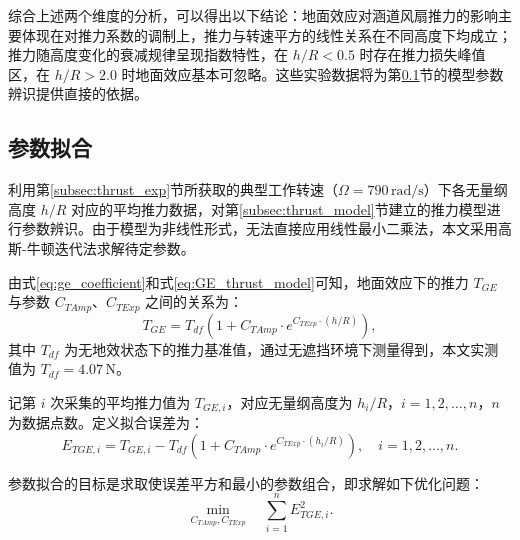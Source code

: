 综合上述两个维度的分析，可以得出以下结论：地面效应对涵道风扇推力的影响主要体现在对推力系数的调制上，推力与转速平方的线性关系在不同高度下均成立；推力随高度变化的衰减规律呈现指数特性，在 $h/R < 0.5$ 时存在推力损失峰值区，在 $h/R > 2.0$ 时地面效应基本可忽略。这些实验数据将为第\ref{subsec:thrust_fitting}节的模型参数辨识提供直接的依据。

\subsection{参数拟合}
\label{subsec:thrust_fitting}

利用第\ref{subsec:thrust_exp}节所获取的典型工作转速（$\Omega = 790\,\mathrm{rad/s}$）下各无量纲高度 $h/R$ 对应的平均推力数据，对第\ref{subsec:thrust_model}节建立的推力模型进行参数辨识。由于模型为非线性形式，无法直接应用线性最小二乘法，本文采用高斯-牛顿迭代法求解待定参数。

由式\eqref{eq:ge_coefficient}和式\eqref{eq:GE_thrust_model}可知，地面效应下的推力 $T_{GE}$ 与参数 $C_{TAmp}$、$C_{TExp}$ 之间的关系为：
\begin{equation}
    T_{GE} = T_{df}\left(1 + C_{TAmp} \cdot e^{C_{TExp} \cdot (h/R)}\right),
    \label{eq:thrust_fit_model}
\end{equation}
其中 $T_{df}$ 为无地效状态下的推力基准值，通过无遮挡环境下测量得到，本文实测值为 $T_{df} = 4.07\,\mathrm{N}$。

记第 $i$ 次采集的平均推力值为 $T_{GE,i}$，对应无量纲高度为 $h_i/R$，$i = 1,2,\dots,n$，$n$ 为数据点数。定义拟合误差为：
\begin{equation}
    E_{TGE,i} = T_{GE,i} - T_{df}\left(1 + C_{TAmp} \cdot e^{C_{TExp} \cdot (h_i/R)}\right),\quad i = 1,2,\dots,n.
\end{equation}

参数拟合的目标是求取使误差平方和最小的参数组合，即求解如下优化问题：
\begin{equation}
    \min_{C_{TAmp}, C_{TExp}} \quad \sum_{i=1}^{n} E_{TGE,i}^2.
    \label{eq:ls_obj}
\end{equation}

